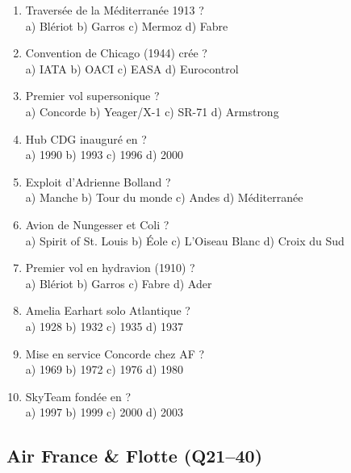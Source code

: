 \begin{enumerate}[nosep]
\item Traversée de la Méditerranée 1913 ? \\ a) Blériot \quad b) Garros \quad c) Mermoz \quad d) Fabre

\item Convention de Chicago (1944) crée ? \\ a) IATA \quad b) OACI \quad c) EASA \quad d) Eurocontrol

\item Premier vol supersonique ? \\ a) Concorde \quad b) Yeager/X-1 \quad c) SR-71 \quad d) Armstrong

\item Hub CDG inauguré en ? \\ a) 1990 \quad b) 1993 \quad c) 1996 \quad d) 2000

\item Exploit d'Adrienne Bolland ? \\ a) Manche \quad b) Tour du monde \quad c) Andes \quad d) Méditerranée

\item Avion de Nungesser et Coli ? \\ a) Spirit of St. Louis \quad b) Éole \quad c) L'Oiseau Blanc \quad d) Croix du Sud

\item Premier vol en hydravion (1910) ? \\ a) Blériot \quad b) Garros \quad c) Fabre \quad d) Ader

\item Amelia Earhart solo Atlantique ? \\ a) 1928 \quad b) 1932 \quad c) 1935 \quad d) 1937

\item Mise en service Concorde chez AF ? \\ a) 1969 \quad b) 1972 \quad c) 1976 \quad d) 1980

\item SkyTeam fondée en ? \\ a) 1997 \quad b) 1999 \quad c) 2000 \quad d) 2003
\end{enumerate}

\subsection*{Air France \& Flotte (Q21--40)}


